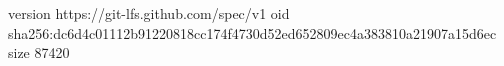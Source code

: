 version https://git-lfs.github.com/spec/v1
oid sha256:dc6d4c01112b91220818cc174f4730d52ed652809ec4a383810a21907a15d6ec
size 87420
